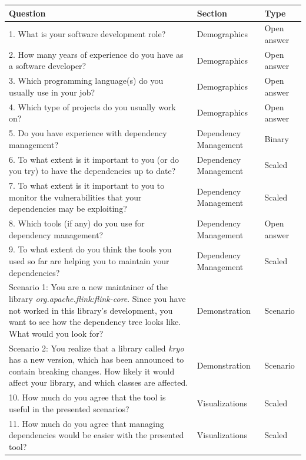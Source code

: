 \begin{table}[p]
    \begin{center}
    \begin{tabularx}{\textwidth}{|X|l|l|}
    \hline
    Question & Section & Type \\\hline
    \hline
    1.  What is your software development role?  & Demographics & Open answer \\\hline
    2.	How many years of experience do you have as a software developer? & Demographics & Open answer \\\hline
    3.	Which programming language(s) do you usually use in your job? & Demographics & Open answer \\\hline
    4.	Which type of projects do you usually work on? & Demographics & Open answer \\\hline
    \hline
    5.	Do you have experience with dependency management? & Dependency Management & Binary \\\hline
    6.	To what extent is it important to you (or do you try) to have the dependencies up to date? & Dependency Management & Scaled \\\hline
    7.	To what extent is it important to you to monitor the vulnerabilities that your dependencies may be exploiting? & Dependency Management & Scaled \\\hline
    8.	Which tools (if any) do you use for dependency management? & Dependency Management & Open answer \\\hline
    9.	To what extent do you think the tools you used so far are helping you to maintain your dependencies? & Dependency Management & Scaled \\\hline
    \hline
    Scenario 1: You are a new maintainer of the library \textit{org.apache.flink:flink-core}. Since you have not worked in this library's development, you want to see how the dependency tree looks like. What would you look for? & Demonstration & Scenario \\\hline
    Scenario 2: You realize that a library called \textit{kryo} has a new version, which has been announced to contain breaking changes. How likely it would affect your library, and which classes are affected. & Demonstration & Scenario \\\hline
    \hline
    10.	How much do you agree that the tool is useful in the presented scenarios? & Visualizations & Scaled \\\hline
    11.	How much do you agree that managing dependencies would be easier with the presented tool? & Visualizations & Scaled \\\hline

\end{tabularx}
\end{center}
\end{table}
